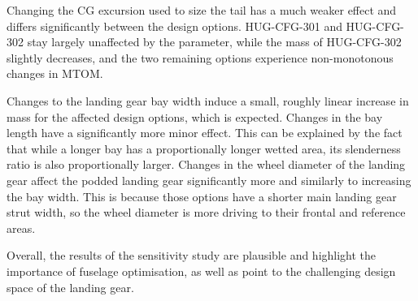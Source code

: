 Changing the CG excursion used to size the tail has a much weaker effect and differs significantly between the design options. HUG-CFG-301 and HUG-CFG-302 stay largely unaffected by the parameter, while the mass of HUG-CFG-302 slightly decreases, and the two remaining options experience non-monotonous changes in MTOM.

Changes to the landing gear bay width induce a small, roughly linear increase in mass for the affected design options, which is expected. Changes in the bay length have a significantly more minor effect. This can be explained by the fact that while a longer bay has a proportionally longer wetted area, its slenderness ratio is also proportionally larger. Changes in the wheel diameter of the landing gear affect the podded landing gear significantly more and similarly to increasing the bay width. This is because those options have a shorter main landing gear strut width, so the wheel diameter is more driving to their frontal and reference areas.

Overall, the results of the sensitivity study are plausible and highlight the importance of fuselage optimisation, as well as point to the challenging design space of the landing gear.




